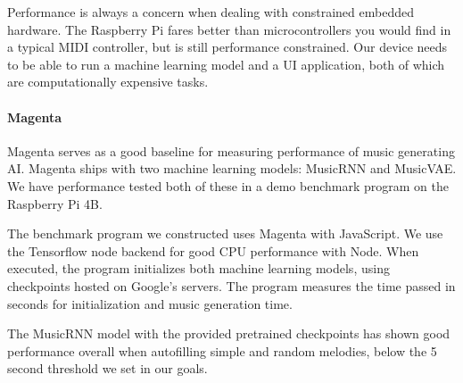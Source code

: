 Performance is always a concern when dealing with constrained embedded hardware. The
Raspberry Pi fares better than microcontrollers you would find in a typical MIDI
controller, but is still performance constrained. Our device needs to be able to run a
machine learning model and a UI application, both of which are computationally expensive
tasks.

\paragraph{Magenta}

Magenta serves as a good baseline for measuring performance of music generating AI.
Magenta ships with two machine learning models: MusicRNN and MusicVAE. We have performance
tested both of these in a demo benchmark program on the Raspberry Pi 4B.

The benchmark program we constructed uses Magenta with JavaScript. We use the Tensorflow
node backend for good CPU performance with Node. When executed, the program initializes
both machine learning models, using checkpoints hosted on Google's servers. The program
measures the time passed in seconds for initialization and music generation time.

The MusicRNN model with the provided pretrained checkpoints has shown good performance
overall when autofilling simple and random melodies, below the 5 second threshold we set
in our goals.

